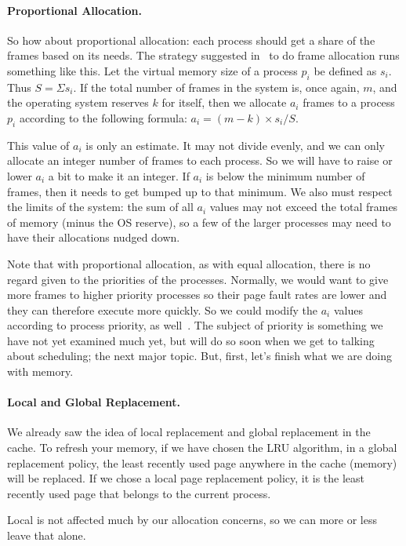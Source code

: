\paragraph{Proportional Allocation.} So how about proportional allocation: each process should get a share of the frames based on its needs. The strategy suggested in~\cite{osc} to do frame allocation runs something like this. Let the virtual memory size of a process $p_{i}$ be defined as $s_{i}$. Thus $S = \Sigma s_{i}$. If the total number of frames in the system is, once again, $m$, and the operating system reserves $k$ for itself, then we allocate $a_{i}$ frames to a process $p_{i}$ according to the following formula: $a_{i} = (m - k) \times s_{i} / S$.

This value of $a_{i}$ is only an estimate. It may not divide evenly, and we can only allocate an integer number of frames to each process.  So we will have to raise or lower $a_{i}$ a bit to make it an integer. If $a_{i}$ is below the minimum number of frames, then it needs to get bumped up to that minimum. We also must respect the limits of the system: the sum of all $a_{i}$ values may not exceed the total frames of memory (minus the OS reserve), so a few of the larger processes may need to have their allocations nudged down.

Note that with proportional allocation, as with equal allocation, there is no regard given to the priorities of the processes. Normally, we would want to give more frames to higher priority processes so their page fault rates are lower and they can therefore execute more quickly. So we could modify the $a_{i}$ values according to process priority, as well~\cite{osc}. The subject of priority is something we have not yet examined much yet, but will do so soon when we get to talking about scheduling; the next major topic. But, first, let's finish what we are doing with memory.

\paragraph{Local and Global Replacement.}
We already saw the idea of local replacement and global replacement in the cache. To refresh your memory, if we have chosen the LRU algorithm, in a global replacement policy, the least recently used page anywhere in the cache (memory) will be replaced. If we chose a local page replacement policy, it is the least recently used page that belongs to the current process.

Local is not affected much by our allocation concerns, so we can more or less leave that alone. 

